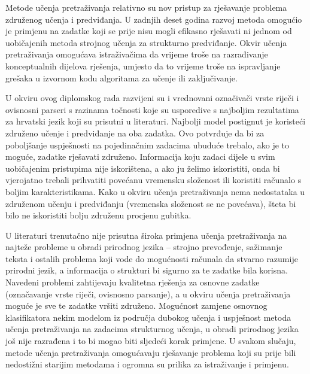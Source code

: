 Metode učenja pretraživanja relativno su nov pristup za rješavanje problema
združenog učenja i predviđanja. U zadnjih deset godina razvoj metoda omogućio je
primjenu na zadatke koji se prije nisu mogli efikasno rješavati ni jednom od
uobičajenih metoda strojnog učenja za strukturno predviđanje. Okvir učenja
pretraživanja omogućava istraživačima da vrijeme troše na razrađivanje
konceptualnih dijelova rješenja, umjesto da to vrijeme troše na ispravljanje
grešaka u izvornom kodu algoritama za učenje ili zaključivanje.

U okviru ovog diplomskog rada razvijeni su i vrednovani označivači vrste riječi
i ovisnosni parseri s razinama točnosti koje su usporedive s najboljim
rezultatima za hrvatski jezik koji su prisutni u literaturi. Najbolji model
postignut je koristeći združeno učenje i predviđanje na oba zadatka. Ovo
potvrđuje da bi za poboljšanje uspješnosti na pojedinačnim zadacima ubuduće
trebalo, ako je to moguće, zadatke rješavati združeno. Informacija koju zadaci
dijele u svim uobičajenim pristupima nije iskorištena, a ako ju želimo
iskoristiti, onda bi vjerojatno trebali prihvatiti povećanu vremensku složenost
ili koristiti računalo s boljim karakteristikama. Kako u okviru učenja
pretraživanja nema nedostataka u združenom učenju i predviđanju (vremenska
složenost se ne povećava), šteta bi bilo ne iskoristiti bolju združenu procjenu
gubitka.

U literaturi trenutačno nije prisutna široka primjena učenja pretraživanja na
najteže probleme u obradi prirodnog jezika -- strojno prevođenje, sažimanje
teksta i ostalih problema koji vode do mogućnosti računala da stvarno razumije
prirodni jezik, a informacija o strukturi bi sigurno za te zadatke bila korisna.
Navedeni problemi zahtijevaju kvalitetna rješenja za osnovne zadatke
(označavanje vrste riječi, ovisnosno parsanje), a u okviru učenja
pretraživanja moguće je sve te zadatke vršiti združeno. Mogućnost zamjene
osnovnog klasifikatora nekim modelom iz područja dubokog učenja  i uspješnost metoda učenja pretraživanja na zadacima strukturnog
učenja, u obradi prirodnog jezika još nije razrađena i to bi mogao biti sljedeći
korak primjene. U svakom slučaju, metode učenja pretraživanja omogućavaju
rješavanje problema koji su prije bili nedostižni starijim metodama i ogromna su
prilika za istraživanje i primjenu.
